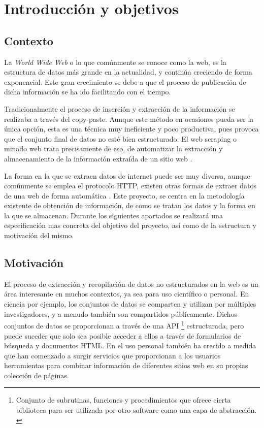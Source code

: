 \chapter{Introducción y objetivos}
\label{cha:introduccion y objetivos}

\section{Contexto}
\label{sec:contexto}

La \textit{World Wide Web} o lo que comúnmente se conoce como la web, es la estructura de datos más
grande en la actualidad, y continúa creciendo de forma exponencial. Este gran crecimiento se debe a que el
proceso de publicación de dicha información se ha ido facilitando con el tiempo.

Tradicionalmente el proceso de inserción y extracción de la información se realizaba a través del
copy-paste. Aunque este método en ocasiones pueda ser la única opción, esta es una técnica muy ineficiente
y poco productiva, pues provoca que el conjunto final de datos no esté bien estructurado. El web scraping 
o minado web trata precisamente de eso, de automatizar la extracción y almacenamiento de la información
extraída de un sitio web \cite{web-scraping-wikipedia}.

La forma en la que se extraen datos de internet puede ser muy diversa, aunque comúnmente se emplea el
protocolo HTTP, existen otras formas de extraer datos de una web de forma automática
\cite{web-scraping-bozhao}. Este proyecto, se centra en la metodología existente de obtención de
información, de como se tratan los datos y la forma en la que se almacenan. Durante los siguientes
apartados se realizará una especificación mas concreta del objetivo del proyecto, así como de la
estructura y motivación del mismo.

\section{Motivación}
\label{sec:motivacion}

El proceso de extracción y recopilación de datos no estructurados en la web es un área interesante en
muchos contextos, ya sea para uso científico o personal. En ciencia por ejemplo, los conjuntos de datos
se comparten y utilizan por múltiples investigadores, y a menudo también  son compartidos públicamente.
Dichos conjuntos de datos se proporcionan a través de una API \footnote{Conjunto de subrutinas, funciones
y procedimientos que ofrece cierta biblioteca para ser utilizada por otro software como una capa de
abstracción. \cite{api-wikipedia}} estructurada, pero puede suceder que solo sea posible acceder a ellos 
a través de formularios de búsqueda y documentos HTML. En el uso personal también ha crecido a medida 
que han comenzado a surgir servicios que proporcionan a los usuarios herramientas para combinar información 
de diferentes sitios web en su propias colección de páginas.

